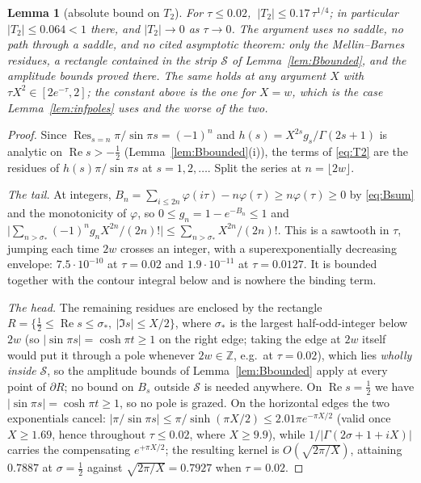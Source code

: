\documentclass[11pt]{article}
\theoremstyle{plain}
\newtheorem{lemma}[theorem]{Lemma}
\theoremstyle{definition}
\theoremstyle{remark}
\newcommand{\Z}{\mathbb{Z}}
\renewcommand{\Re}{\operatorname{Re}}
\begin{document}
\begin{lemma}[absolute bound on $T_2$]\label{lem:T2abs}
For $\tau\le0.02$, $\ |T_2|\le0.17\,\tau^{1/4}$; in particular $|T_2|\le0.064<1$ there, and
$|T_2|\to0$ as $\tau\to0$. The argument uses no saddle, no path through a saddle, and no cited
asymptotic theorem: only the Mellin--Barnes residues, a rectangle contained in the strip
$\mathcal S$ of Lemma~\ref{lem:Bbounded}, and the amplitude bounds proved there. The same holds at
any argument $X$ with $\tau X^2\in[2e^{-\tau},2]$; the constant above is the one for $X=w$, which
is the case Lemma~\ref{lem:infpoles} uses and the worse of the two.
\end{lemma}

\begin{proof}
Since $\operatorname{Res}_{s=n}\pi/\sin\pi s=(-1)^n$ and $h(s)=X^{2s}g_s/\Gamma(2s+1)$ is analytic
on $\Re s>-\tfrac12$ (Lemma~\ref{lem:Bbounded}(i)), the terms of \eqref{eq:T2} are the residues of
$h(s)\pi/\sin\pi s$ at $s=1,2,\dots$. Split the series at $n=\lfloor2w\rfloor$.

\emph{The tail.} At integers, $B_n=\sum_{i\le2n}\varphi(i\tau)-n\varphi(\tau)\ge n\varphi(\tau)\ge0$
by \eqref{eq:Bsum} and the monotonicity of $\varphi$, so $0\le g_n=1-e^{-B_n}\le1$ and
$\bigl|\sum_{n>\sigma_\ast}(-1)^ng_nX^{2n}/(2n)!\bigr|\le\sum_{n>\sigma_\ast}X^{2n}/(2n)!$. This
is a sawtooth in $\tau$, jumping each time $2w$ crosses an integer, with a superexponentially
decreasing envelope: $7.5\cdot10^{-10}$ at $\tau=0.02$ and $1.9\cdot10^{-11}$ at $\tau=0.0127$.
It is bounded together with the contour integral below and is nowhere the binding term.

\emph{The head.} The remaining residues are enclosed by the rectangle
$R=\{\tfrac12\le\Re s\le\sigma_\ast,\ |\Im s|\le X/2\}$, where $\sigma_\ast$ is the largest
half-odd-integer below $2w$ (so $|\sin\pi s|=\cosh\pi t\ge1$ on the right edge; taking the edge at
$2w$ itself would put it through a pole whenever $2w\in\Z$, e.g.\ at $\tau=0.02$), which lies \emph{wholly inside} $\mathcal S$, so the
amplitude bounds of Lemma~\ref{lem:Bbounded} apply at every point of $\partial R$; no bound on
$B_s$ outside $\mathcal S$ is needed anywhere. On $\Re s=\tfrac12$ we have $|\sin\pi s|=\cosh\pi t\ge1$,
so no pole is grazed. On the horizontal edges the two exponentials cancel:
$|\pi/\sin\pi s|\le\pi/\sinh(\pi X/2)\le2.01\pi e^{-\pi X/2}$ (valid once $X\ge1.69$, hence
throughout $\tau\le0.02$, where $X\ge9.9$), while $1/|\Gamma(2\sigma+1+iX)|$ carries the
compensating $e^{+\pi X/2}$; the resulting kernel is $O(\sqrt{2\pi/X})$, attaining $0.7887$ at $\sigma=\tfrac12$ against $\sqrt{2\pi/X}=0.7927$ when $\tau=0.02$.


\end{proof}
\end{document}
